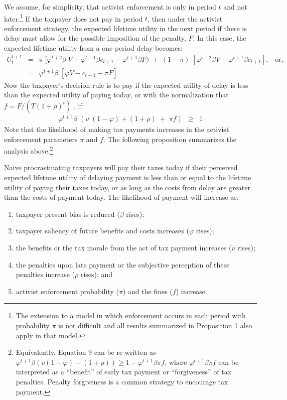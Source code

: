 We assume, for simplicity, that activist enforcement is only in period
$t$ and not later.\footnote{The extension to a model in which
  enforcement occurs in each period with probability $\pi$ is not
  difficult and all results summarized in Proposition 1 also apply in
  that model.}  If the taxpayer does not pay in period $t$, then
under the activist enforcement strategy, the expected lifetime utility
in the next period if there is delay must allow for the possible
imposition of the penalty, $F$.  In this case, the expected lifetime
utility from a one period delay becomes:
\begin{eqnarray}\label{eq8}
U_t^{t+1} &=& \pi  \; [\varphi^{t+2} \beta \; V - \varphi^{t+1} \beta c_
  {t+1} - \varphi^{t+1} \beta F ) \; +  \; (1-\pi) \;  [\varphi^{t+2} \beta V -
    \varphi^{t+1} \beta c_ {t+1}], \; \; \; \mbox{or}, \nonumber  \\ 
&=& \varphi^{t+1} \beta \; [ \varphi V - c_ {t+1} - \pi F ]
 \end{eqnarray}
Now the taxpayer's decision rule is to pay if the expected utility of
delay is less than the expected utility of paying today, or with the
normalization that $f = F/(T(1 + \rho)^{t})$ , if:
\begin{eqnarray}\label{eq9}
\varphi^{t+1} \beta \; (v \; (1-\varphi) + (1 + \rho) \; + \; \pi f)
&\ge& 1
\end{eqnarray}
Note that the likelihood of making tax payments increases in the
activist enforcement parameters $\pi$ and $f$. The following proposition  
summarizes the analysis above.\footnote{Equivalently, Equation 9 can be re-written as $\varphi^{t+1} \beta (v (1-\varphi) + (1 + \rho) ) \ge 1 - \varphi^{t+1}\beta\pi f$, where $\varphi^{t+1}\beta\pi f$ can be interpreted as a ``benefit'' of early tax payment or ``forgiveness'' of tax penalties. Penalty forgiveness is a common strategy to encourage tax payment. }
\begin{prop}
Naive procrastinating taxpayers will pay their taxes today if their
perceived expected lifetime utility of delaying payment is less
than or equal to the lifetime utility of paying their taxes today, or as long as the costs from delay are greater than the costs of payment today. The likelihood of payment will increase as:
\begin{enumerate}
\item taxpayer present bias is reduced ($\beta$ rises); 
\item taxpayer saliency of future benefits and costs increases
  ($\varphi$ rises);
\item the benefits or the tax morale from the act of tax payment increases ($v$ rises);
\item the  penalties upon late payment or the subjective perception of these penalties increase
  ($\rho$ rises); and
\item activist enforcement probability ($\pi$) and the fines ($f$) increase.
\end{enumerate}
\end{prop}

